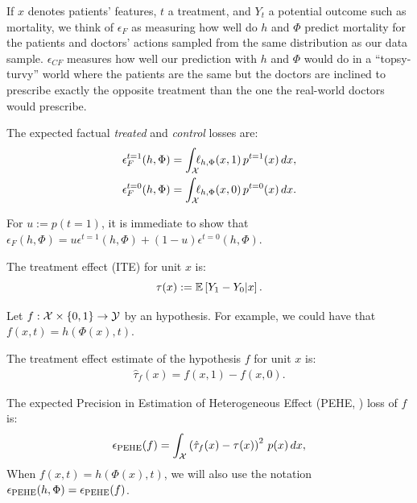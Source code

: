 If $x$ denotes patients' features, $t$ a treatment, and $Y_t$ a potential outcome such as mortality, we think of $\epsilon_F$ as measuring how well do $h$ and $\Phi$ predict mortality for the patients and doctors' actions sampled from the same distribution as our data sample. $\epsilon_{CF}$ measures how well our prediction with $h$ and $\Phi$ would do in a ``topsy-turvy'' world where the patients are the same but the doctors are inclined to prescribe exactly the opposite treatment than the one the real-world doctors would prescribe.

\begin{thmdef}\label{def:decompef}
The expected factual \emph{treated} and \emph{control} losses are:
\begin{align*}
&\epsilon^{t=1}_F(h,\Phi) = \int_{\mathcal X } \!\!\! \ell_{h,\Phi}(x,1)\, p^{t=1}(x)\, dx ,\\
&\epsilon^{t=0}_F(h,\Phi) = \int_{\mathcal X } \!\!\! \ell_{h,\Phi}(x,0)\, p^{t=0}(x)\, dx .
\end{align*}
\end{thmdef}
For $u:=p(t=1)$, it is immediate to show that $\epsilon_F(h,\Phi) = u \epsilon^{t=1}(h,\Phi) + (1-u) \epsilon^{t=0}(h,\Phi)$.


\begin{thmdef}\label{def:te}
The treatment effect (ITE) for unit $x$ is:
$$\tau(x) := \mathbb{E}\left[Y_1 - Y_0 | x \right].$$
\end{thmdef}

Let $f: \mathcal X \times \{0,1\} \rightarrow \mathcal Y$ by an hypothesis. For example, we could have that $f(x,t) = h(\Phi(x),t)$.
\begin{thmdef}\label{def:inditeerr}
The treatment effect estimate of the hypothesis $f$ for unit $x$ is:
\begin{align*}
\hat{\tau}_f  (x) = f(x,1) - f(x,0).
\end{align*}
\end{thmdef}


\begin{thmdef}
The expected Precision in Estimation of Heterogeneous Effect (PEHE,  \citet{hill2011bayesian}) loss of $f$ is:
\begin{equation}
\label{eq:pehe}
\epsilon_{\text{PEHE}}(f) = \int_{\mathcal X } \left( \hat{\tau}_f(x) - \tau(x) \right)^2 \, p(x) \, dx ,
\end{equation}
When $f(x,t) = h(\Phi(x),t)$, we will also use the notation $\epsilon_{\text{PEHE}}(h,\Phi) = \epsilon_{\text{PEHE}}(f)$.
\end{thmdef}

